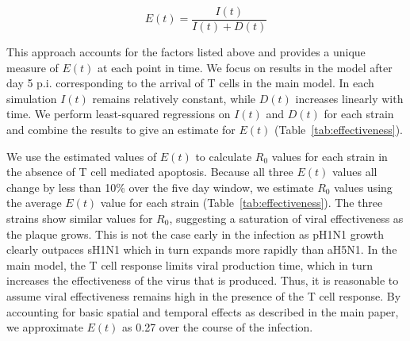 \documentclass[preprint,10pt,authoryear]{article}
\newcommand{\removed}[1]{{\color{dkred}\sout{#1}}}
\newcommand{\drew}[1]{{\color{dkgreen}#1}}
\newcommand{\fred}[1]{{\color{dkblue}#1}}
\begin{document}
\begin{equation}
E(t) = \frac{I(t)}{I(t) + D(t)}
\end{equation}

This approach accounts for the factors listed above and provides a unique measure of $E(t)$ at each point in time.  We focus on results in the model after day 5 p.i. corresponding to the arrival of T cells in the main model.  In each simulation $I(t)$ remains relatively constant, while $D(t)$ increases linearly with time.  We perform least-squared regressions on $I(t)$ and $D(t)$ for each strain and combine the results to give an estimate for $E(t)$ (Table~\ref{tab:effectiveness}).  

We use the estimated values of $E(t)$ to calculate $R_0$ values for each strain in the absence of T cell mediated apoptosis.  Because all three $E(t)$ values all change by less than 10\% over the five day window, we estimate $R_0$ values using the average $E(t)$ value for each strain (Table~\ref{tab:effectiveness}).  The three strains show similar values for $R_0$, suggesting a saturation of viral effectiveness as the plaque grows.   This is not the case early in the infection as pH1N1 growth clearly outpaces sH1N1 which in turn expands more rapidly than aH5N1.  In the main model, the T cell response limits viral production time, which in turn increases the effectiveness of the virus that is produced.  Thus, it is reasonable to assume viral effectiveness remains high in the presence of the T cell response.  By accounting for basic spatial and temporal effects as described in the main paper, we approximate $E(t)$ as 0.27 over the course of the infection.


%

\end{document}
